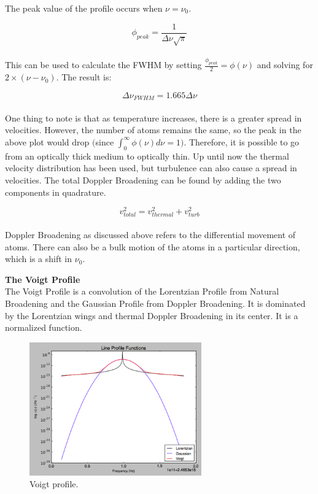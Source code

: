 \documentclass{article}
\begin{document}
The peak value of the profile occurs when $\nu = \nu_{0}$.

$$\phi_{peak} = {\frac{1}{\Delta\nu\sqrt{\pi}}}$$ \\

This can be used to calculate the FWHM by setting ${\frac{\phi_{peak}}{2}} = \phi(\nu)$ and solving for $2\times (\nu-\nu_{0})$. The result is:

$$\Delta\nu_{FWHM} = 1.665\Delta\nu$$ \\

One thing to note is that as temperature increases, there is a greater spread in velocities. However, the number of atoms remains the same, so the peak in the above plot would drop $\bigg($since $\int_{0}^{\infty} \phi(\nu) d\nu = 1\bigg)$. Therefore, it is possible to go from an optically thick medium to optically thin. Up until now the thermal velocity distribution has been used, but turbulence can also cause a spread in velocities. The total Doppler Broadening can be found by adding the two components in quadrature. 

$$v_{total}^{2} = v_{thermal}^{2} + v_{turb}^{2}$$\\

Doppler Broadening as discussed above refers to the differential movement of atoms. There can also be a bulk motion of the atoms in a particular direction, which is a shift in $\nu_{0}$.

\textbf{The Voigt Profile}\\

The Voigt Profile is a convolution of the Lorentzian Profile from Natural Broadening and the Gaussian Profile from Doppler Broadening. It is dominated by the Lorentzian wings and thermal Doppler Broadening in its center. It is a normalized function.

\begin{figure}[ht]
    \centering
    \includegraphics[width=0.66\textwidth]{figures/hw11pic1.png}
    \caption{Voigt profile.}
    \label{fig:voigt1}
\end{figure}
\end{document}
